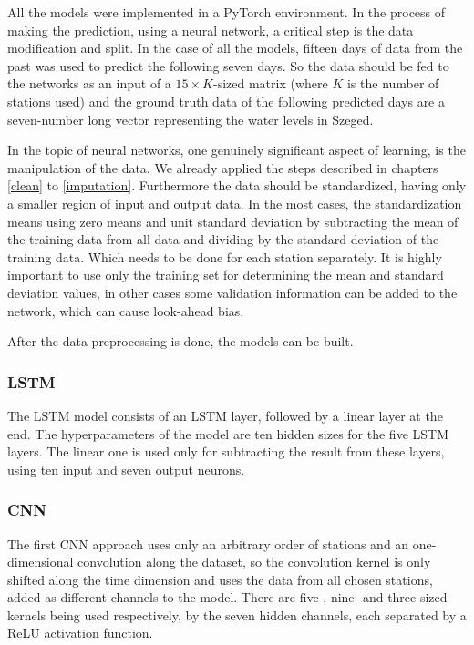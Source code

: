 \documentclass{article}
\begin{document}
All the models were implemented in a PyTorch environment. In the process of
making the prediction, using a neural network, a critical step is the data
modification and split. In the case of all the models, fifteen days of data
from the past was used to predict the following seven days. So the data should
be fed to the networks as an input of a $15 \times K$-sized matrix (where $K$
is the number of stations used) and the ground truth data of the following
predicted days are a seven-number long vector representing the water levels in
Szeged.

In the topic of neural networks, one genuinely significant aspect of learning,
is the manipulation of the data. We already applied the steps described in
chapters \ref{clean} to \ref{imputation}. Furthermore the data should be
standardized, having only a smaller region of input and output data. In the
most cases, the standardization means using zero means and unit standard
deviation by subtracting the mean of the training data from all data and
dividing by the standard deviation of the training data. Which needs to be
done for each station separately. It is highly important to use only the
training set for determining the mean and standard deviation values, in other
cases some validation information can be added to the network, which can cause
look-ahead bias.

After the data preprocessing is done, the models can be built.

\subsubsection{LSTM}

The LSTM model consists of an LSTM layer, followed by a linear layer at the
end. The hyperparameters of the model are ten hidden sizes for the five LSTM
layers. The linear one is used only for subtracting the result from these
layers, using ten input and seven output neurons.

\subsubsection{CNN}

The first CNN approach uses only an arbitrary order of stations and an
one-dimensional convolution along the dataset, so the convolution kernel is
only shifted along the time dimension and uses the data from all chosen
stations, added as different channels to the model. There are five-, nine- and
three-sized kernels being used respectively, by the seven hidden channels,
each separated by a ReLU activation function.
\end{document}
